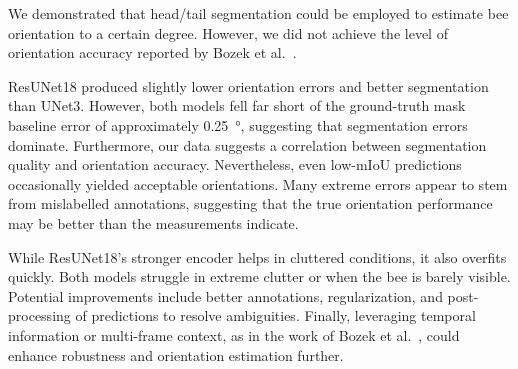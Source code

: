 We demonstrated that head/tail segmentation could be employed to estimate bee orientation to a certain degree. However, we did not achieve the level of orientation accuracy reported by Bozek et al.~\cite{bozek2021markerless}.

ResUNet18 produced slightly lower orientation errors and better segmentation than UNet3.
However, both models fell far short of the ground-truth mask baseline error of approximately \qty{0.25}{\degree}, suggesting that segmentation errors dominate.
Furthermore, our data suggests a correlation between segmentation quality and orientation accuracy.
Nevertheless, even low-mIoU predictions occasionally yielded acceptable orientations.
Many extreme errors appear to stem from mislabelled annotations, suggesting that the true orientation performance may be better than the measurements indicate.

While ResUNet18’s stronger encoder helps in cluttered conditions, it also overfits quickly.
Both models struggle in extreme clutter or when the bee is barely visible.
Potential improvements include better annotations, regularization, and post-processing of predictions to resolve ambiguities.
Finally, leveraging temporal information or multi-frame context, as in the work of Bozek et al.~\cite{bozek2018pixel, bozek2021markerless}, could enhance robustness and orientation estimation further.